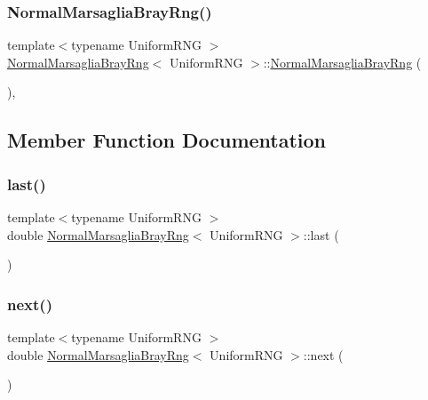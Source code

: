 \subsubsection{\texorpdfstring{Normal\+Marsaglia\+Bray\+Rng()}{NormalMarsagliaBrayRng()}}
{\footnotesize\ttfamily template$<$typename Uniform\+R\+NG $>$ \\
\hyperlink{class_normal_marsaglia_bray_rng}{Normal\+Marsaglia\+Bray\+Rng}$<$ Uniform\+R\+NG $>$\+::\hyperlink{class_normal_marsaglia_bray_rng}{Normal\+Marsaglia\+Bray\+Rng} (\begin{DoxyParamCaption}{ }\end{DoxyParamCaption})\hspace{0.3cm}{\ttfamily [inline]}, {\ttfamily [private]}}



\subsection{Member Function Documentation}
\hypertarget{class_normal_marsaglia_bray_rng_af90ac458fcbf302dfad98816132658c2}{}\label{class_normal_marsaglia_bray_rng_af90ac458fcbf302dfad98816132658c2} 
\subsubsection{\texorpdfstring{last()}{last()}}
{\footnotesize\ttfamily template$<$typename Uniform\+R\+NG $>$ \\
double \hyperlink{class_normal_marsaglia_bray_rng}{Normal\+Marsaglia\+Bray\+Rng}$<$ Uniform\+R\+NG $>$\+::last (\begin{DoxyParamCaption}{ }\end{DoxyParamCaption})\hspace{0.3cm}{\ttfamily [inline]}}

\hypertarget{class_normal_marsaglia_bray_rng_a2cc54f5f331a5bd71eedc67c84db7279}{}\label{class_normal_marsaglia_bray_rng_a2cc54f5f331a5bd71eedc67c84db7279} 
\subsubsection{\texorpdfstring{next()}{next()}}
{\footnotesize\ttfamily template$<$typename Uniform\+R\+NG $>$ \\
double \hyperlink{class_normal_marsaglia_bray_rng}{Normal\+Marsaglia\+Bray\+Rng}$<$ Uniform\+R\+NG $>$\+::next (\begin{DoxyParamCaption}{ }\end{DoxyParamCaption})}



